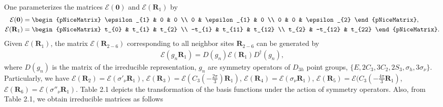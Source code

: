 \documentclass{report}
\begin{document}
One parameterizes the matrices $\mathcal{E}(\mathbf{0})$ and $\mathcal{E}(\mathbf{R}_{1})$ by
\begin{equation}
	\renewcommand{\arraystretch}{0.7}
	\begin{aligned}
		\mathcal{E}(\mathbf{0})
		 & =
		\begin{pNiceMatrix}
			\epsilon_{1} & 0            & 0            \\
			0            & \epsilon_{1} & 0            \\
			0            & 0            & \epsilon_{2}
		\end{pNiceMatrix}, \\
		\mathcal{E}(\mathbf{R}_{1})
		 & =
		\begin{pNiceMatrix}
			t_{0}  & t_{1}   & t_{2}  \\
			-t_{1} & t_{11}  & t_{12} \\
			t_{2}  & -t_{12} & t_{22}
		\end{pNiceMatrix}.
	\end{aligned}
\end{equation}
Given $\mathcal{E}(\mathbf{R}_{1})$, the matrix $\mathcal{E}(\mathbf{R}_{2-6})$ corresponding to all neighbor sites $\mathbf{R}_{2-6}$ can be generated by
\begin{gather}
	\mathcal{E}(g_{n} \mathbf{R}_{1}) = D(g_{n}) \mathcal{E} (\mathbf{R}_{1}) D^{\dagger}(g_{n}),
\end{gather}
where $D(g_{n})$ is the matrix of the irreducible representation, $g_{n}$ are symmetry operators of $D_{3h}$ point groups, $\{E,2 C_3, 3C_2, 2S_3,\sigma_{h},3\sigma_{\nu}\}$. Particularly, we have $\mathcal{E}(\mathbf{R}_{2}) = \mathcal{E}(\sigma'_{\nu}\mathbf{R}_{1})$, $\mathcal{E}(\mathbf{R}_{3}) = \mathcal{E}(C_{3}(-\frac{2\pi}{3})\mathbf{R}_{1})$,
$\mathcal{E}(\mathbf{R}_{4}) = \mathcal{E}(\sigma_{\nu}\mathbf{R}_{1})$, $\mathcal{E}(\mathbf{R}_{5}) = \mathcal{E}(C_{3}(-\frac{4\pi}{3}\mathbf{R}_{1})$,
$\mathcal{E}(\mathbf{R}_{6}) = \mathcal{E}(\sigma''_{\nu}\mathbf{R}_{1})$.
Table 2.1 depicts the transformation of the basis functions under the action of symmetry operators. Also, from Table 2.1, we obtain irreducible matrices as follows
\end{document}
